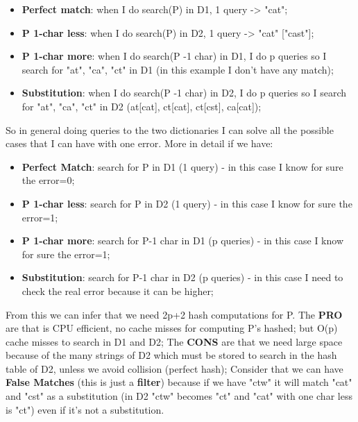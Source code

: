 \begin{itemize}
    \item \textbf{Perfect match}: when I do search(P) in D1, 1 query -> "cat";
    \item \textbf{P 1-char less}: when I do search(P) in D2, 1 query -> "cat" ["cast"];
    \item \textbf{P 1-char more}: when I do search(P -1 char) in D1, I do p queries so I search for {"at", "ca", "ct"} in D1 (in this example I don't have any match);
    \item \textbf{Substitution}: when I do search(P -1 char) in D2, I do p queries so I search for {"at", "ca", "ct"} in D2 (at[cat], ct[cat], ct[cst], ca[cat]);
\end{itemize}
So in general doing queries to the two dictionaries I can solve all the possible cases that I can have with one error.\newline
More in detail if we have:
\begin{itemize}
    \item \textbf{Perfect Match}: search for P in D1 (1 query) - in this case I know for sure the error=0;
    \item \textbf{P 1-char less}: search for P in D2 (1 query) - in this case I know for sure the error=1;
    \item \textbf{P 1-char more}: search for P-1 char in D1 (p queries) - in this case I know for sure the error=1;
    \item \textbf{Substitution}: search for P-1 char in D2 (p queries) - in this case I need to check the real error because it can be higher;
\end{itemize}
From this we can infer that we need 2p+2 hash computations for P.\newline
The \textbf{PRO} are that is CPU efficient, no cache misses for computing P's hashed; but O(p) cache misses to search in D1 and D2;\newline
The \textbf{CONS} are that we need large space because of the many strings of D2 which must be stored to search in the hash table of D2, unless we avoid collision (perfect hash);\newline
Consider that we can have \textbf{False Matches} (this is just a \textbf{filter}) because if we have "ctw" it will match "cat" and "cst" as a substitution (in D2 "ctw" becomes "ct" and "cat" with one char less is "ct") even if it's not a substitution.\newline
